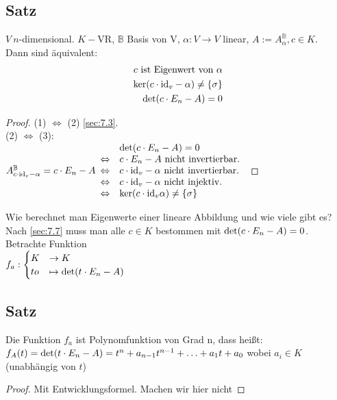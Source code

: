 \subsection{Satz}\label{sec:\thesubsection}
$V\ n$-dimensional. $K-$VR, $\mathbb{B}$ Basis von V, $\alpha : V \to V$ linear, $A := A^{\mathbb{B}}_\alpha, c \in K$.\\
Dann sind äquivalent:
\setcounter{equation}{0}
\begin{eqnarray}
c \text{ ist Eigenwert von }\alpha\\
\ker(c \cdot \mathrm{id}_v - \alpha) \ne \{\sigma \}\\
\det(c \cdot E_n  -A ) = 0
\end{eqnarray}
\begin{proof}
(1) $\Leftrightarrow$ (2) \ref{sec:7.3}.\\
(2) $\Leftrightarrow$ (3):\\
$A^{\mathbb{B}}_{c \cd \mathrm{id}_v - \alpha} = c \cd E_n - A\\
\begin{array}{{ll}}
&\det(c \cd E_n - A) = 0\\
\Leftrightarrow& c \cd E_n - A \text{ nicht invertierbar.}\\
\Leftrightarrow& c \cd \mathrm{id}_v - \alpha \text{ nicht invertierbar.}\\
\Leftrightarrow& c \cd \mathrm{id}_v - \alpha \text{ nicht injektiv.}\\
\Leftrightarrow& \ker(c \cd \mathrm{id}_v \alpha) \ne \{\sigma\}  \\
\end{array}$
\end{proof}
\begin{mdframed}
Wie berechnet man Eigenwerte einer lineare Abbildung und wie viele gibt es?\\
Nach \ref{sec:7.7} muss man alle $c \in K$ bestommen mit $\det(c \cdot E_n - A) = 0$.\\
Betrachte Funktion\\
$f_a : \begin{cases}
K &\to K\\
to &\mapsto \det(t \cdot E_n -A)
\end{cases}$
\end{mdframed}
\subsection{Satz}\label{sec:\thesubsection}
Die Funktion $f_a$ ist Polynomfunktion von Grad n, dass hei\ss t:\\
$f_A(t) = \det(t \cdot E_n - A) = t^n + a_{n-1}t^{n-1}+ \ldots + a_1t + a_0$ wobei $a_i \in K$ (unabhängig von $t$)
\begin{proof}
Mit Entwicklungsformel. Machen wir hier nicht
\end{proof}
